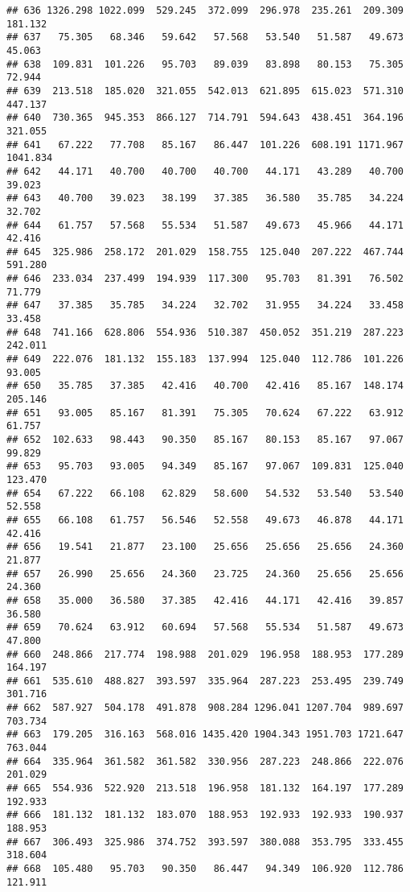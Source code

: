 \documentclass[
]{article}
\begin{document}
\begin{verbatim}
## 636 1326.298 1022.099  529.245  372.099  296.978  235.261  209.309  181.132
## 637   75.305   68.346   59.642   57.568   53.540   51.587   49.673   45.063
## 638  109.831  101.226   95.703   89.039   83.898   80.153   75.305   72.944
## 639  213.518  185.020  321.055  542.013  621.895  615.023  571.310  447.137
## 640  730.365  945.353  866.127  714.791  594.643  438.451  364.196  321.055
## 641   67.222   77.708   85.167   86.447  101.226  608.191 1171.967 1041.834
## 642   44.171   40.700   40.700   40.700   44.171   43.289   40.700   39.023
## 643   40.700   39.023   38.199   37.385   36.580   35.785   34.224   32.702
## 644   61.757   57.568   55.534   51.587   49.673   45.966   44.171   42.416
## 645  325.986  258.172  201.029  158.755  125.040  207.222  467.744  591.280
## 646  233.034  237.499  194.939  117.300   95.703   81.391   76.502   71.779
## 647   37.385   35.785   34.224   32.702   31.955   34.224   33.458   33.458
## 648  741.166  628.806  554.936  510.387  450.052  351.219  287.223  242.011
## 649  222.076  181.132  155.183  137.994  125.040  112.786  101.226   93.005
## 650   35.785   37.385   42.416   40.700   42.416   85.167  148.174  205.146
## 651   93.005   85.167   81.391   75.305   70.624   67.222   63.912   61.757
## 652  102.633   98.443   90.350   85.167   80.153   85.167   97.067   99.829
## 653   95.703   93.005   94.349   85.167   97.067  109.831  125.040  123.470
## 654   67.222   66.108   62.829   58.600   54.532   53.540   53.540   52.558
## 655   66.108   61.757   56.546   52.558   49.673   46.878   44.171   42.416
## 656   19.541   21.877   23.100   25.656   25.656   25.656   24.360   21.877
## 657   26.990   25.656   24.360   23.725   24.360   25.656   25.656   24.360
## 658   35.000   36.580   37.385   42.416   44.171   42.416   39.857   36.580
## 659   70.624   63.912   60.694   57.568   55.534   51.587   49.673   47.800
## 660  248.866  217.774  198.988  201.029  196.958  188.953  177.289  164.197
## 661  535.610  488.827  393.597  335.964  287.223  253.495  239.749  301.716
## 662  587.927  504.178  491.878  908.284 1296.041 1207.704  989.697  703.734
## 663  179.205  316.163  568.016 1435.420 1904.343 1951.703 1721.647  763.044
## 664  335.964  361.582  361.582  330.956  287.223  248.866  222.076  201.029
## 665  554.936  522.920  213.518  196.958  181.132  164.197  177.289  192.933
## 666  181.132  181.132  183.070  188.953  192.933  192.933  190.937  188.953
## 667  306.493  325.986  374.752  393.597  380.088  353.795  333.455  318.604
## 668  105.480   95.703   90.350   86.447   94.349  106.920  112.786  121.911

\end{verbatim}
\end{document}
